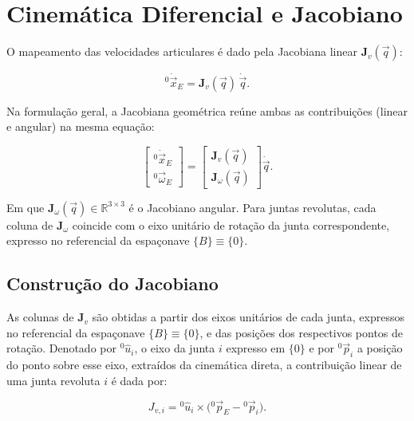 \section{Cinemática Diferencial e Jacobiano}
\label{sec_cinematica_diferencial_jacobiano}

O mapeamento das velocidades articulares é dado pela Jacobiana linear $\mathbf{J}_{v}(\vec q)$:

\begin{equation}
\label{eq_jacob_linear1}
{}^{0}\!\dot{\vec{x}}_{E} = \mathbf{J}_{v}(\vec q)\,\dot{\vec q}.
\end{equation}

Na formulação geral, a Jacobiana geométrica reúne ambas as contribuições (linear e angular) na mesma equação:

\begin{equation}
\begin{bmatrix}
{}^{0}\!\dot{\vec{x}}_{E} \\
{}^{0}\!\vec{\omega}_{E}
\end{bmatrix}
=
\begin{bmatrix}
\mathbf{J}_{v}(\vec q) \\
\mathbf{J}_{\omega}(\vec q)
\end{bmatrix}
\dot{\vec q}.
\end{equation}

Em que $\mathbf{J}_{\omega}(\vec q)\in\mathbb{R}^{3\times 3}$ é o Jacobiano angular.
Para juntas revolutas, cada coluna de $\mathbf{J}_{\omega}$ coincide com o eixo unitário de rotação da junta correspondente, expresso no referencial da espaçonave $\{B\}\equiv\{0\}$.

\subsection{Construção do Jacobiano}

As colunas de $\mathbf{J}_{v}$ são obtidas a partir dos eixos unitários de cada junta, expressos no referencial da espaçonave $\{B\}\equiv\{0\}$, e das posições dos respectivos pontos de rotação.
Denotado por ${}^{0}\!\hat{u}_{i}$, o eixo da junta $i$ expresso em $\{0\}$ e por ${}^{0}\!\vec p_{i}$ a posição do ponto sobre esse eixo, extraídos da cinemática direta, a contribuição linear de uma junta revoluta $i$ é dada por:

\begin{equation}
J_{v,i}
=
{}^{0}\!\hat{u}_{i}
\times
\bigl(
{}^{0}\!\vec p_{E}
-
{}^{0}\!\vec p_{i}
\bigr).
\end{equation}

